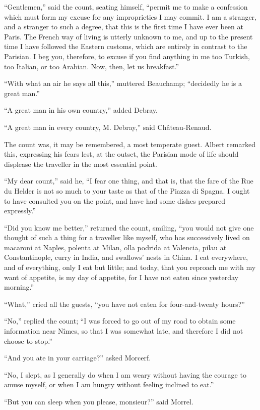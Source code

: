 “Gentlemen,” said the count, seating himself, “permit me to make a
confession which must form my excuse for any improprieties I may
commit. I am a stranger, and a stranger to such a degree, that this is
the first time I have ever been at Paris. The French way of living is
utterly unknown to me, and up to the present time I have followed the
Eastern customs, which are entirely in contrast to the Parisian. I beg
you, therefore, to excuse if you find anything in me too Turkish, too
Italian, or too Arabian. Now, then, let us breakfast.”

“With what an air he says all this,” muttered Beauchamp; “decidedly he
is a great man.”

“A great man in his own country,” added Debray.

“A great man in every country, M. Debray,” said Château-Renaud.

The count was, it may be remembered, a most temperate guest. Albert
remarked this, expressing his fears lest, at the outset, the Parisian
mode of life should displease the traveller in the most essential
point.

“My dear count,” said he, “I fear one thing, and that is, that the fare
of the Rue du Helder is not so much to your taste as that of the Piazza
di Spagna. I ought to have consulted you on the point, and have had
some dishes prepared expressly.”

“Did you know me better,” returned the count, smiling, “you would not
give one thought of such a thing for a traveller like myself, who has
successively lived on macaroni at Naples, polenta at Milan, olla
podrida at Valencia, pilau at Constantinople, curry in India, and
swallows’ nests in China. I eat everywhere, and of everything, only I
eat but little; and today, that you reproach me with my want of
appetite, is my day of appetite, for I have not eaten since yesterday
morning.”

“What,” cried all the guests, “you have not eaten for four-and-twenty
hours?”

“No,” replied the count; “I was forced to go out of my road to obtain
some information near Nîmes, so that I was somewhat late, and therefore
I did not choose to stop.”

“And you ate in your carriage?” asked Morcerf.

“No, I slept, as I generally do when I am weary without having the
courage to amuse myself, or when I am hungry without feeling inclined
to eat.”

“But you can sleep when you please, monsieur?” said Morrel.

